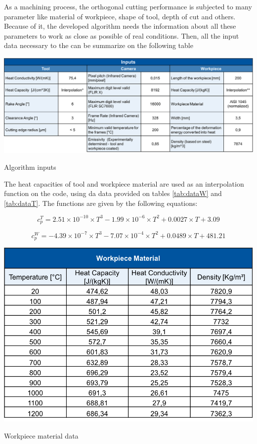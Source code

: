 	As a machining process, the orthogonal cutting performance is subjected to many parameter like material of workpiece, shape of tool, depth of cut and others. Because of it, the developed algorithm needs the information about all these parameters to work as close as possible of real conditions. Then, all the input data necessary to the can be summarize on the following table

	\begin{table}[H]
		\centering
		\captionsetup{justification=centering}
		\includegraphics[scale = 0.6]{Imagens/Inputs.png}
		\caption{Algorithm inputs \cite{augspurger2016experimental}}
		\label{tab:inputs}
	\end{table}

	The heat capacities of tool and workpiece material are used as an interpolation function on the code, using da data provided on tables \ref{tab:dataW} and \ref{tab:dataT}. The functions are given by the following equations:

	\begin{equation} 
	\label{eq_heatCapTool}
		c_{p}^{T} = 2.51\times 10^{- 10}\times T^{3} - 1.99\times 10^{- 6} \times T^{2} + 0.0027 \times T + 3.09
	\end{equation}

	\begin{equation} 
	\label{eq_heatCapWork}
		c_{p}^{W} = -4.39\times 10^{- 7}\times T^{3} - 7.07\times 10^{- 4} \times T^{2} + 0.0489 \times T + 481.21
	\end{equation}

	\begin{table}[h]
		\centering
		\captionsetup{justification=centering}
		\includegraphics[scale = 0.6]{Imagens/dataWorkpiece.png}
		\caption{Workpiece material data \cite{augspurger2016experimental}}
		\label{tab:dataW}
	\end{table}

